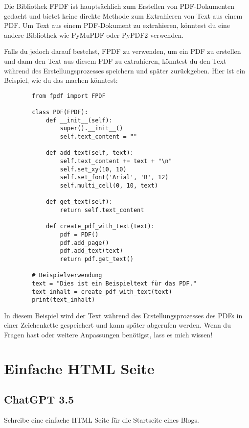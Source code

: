 \begin{tcolorbox}[
	enhanced,
	breakable,
	colback=BhtGrey!5!white,
	colframe=BhtGrey!75!black!50,
	title= Copilot
	]
	Die Bibliothek FPDF ist hauptsächlich zum Erstellen von PDF-Dokumenten gedacht und bietet keine direkte Methode zum Extrahieren von Text aus einem PDF. Um Text aus einem PDF-Dokument zu extrahieren, könntest du eine andere Bibliothek wie PyMuPDF oder PyPDF2 verwenden.
	
	Falls du jedoch darauf bestehst, FPDF zu verwenden, um ein PDF zu erstellen und dann den Text aus diesem PDF zu extrahieren, könntest du den Text während des Erstellungsprozesses speichern und später zurückgeben. Hier ist ein Beispiel, wie du das machen könntest:
	\begin{verbatim}
		from fpdf import FPDF
		
		class PDF(FPDF):
		    def __init__(self):
		        super().__init__()
		        self.text_content = ""
		
		    def add_text(self, text):
		        self.text_content += text + "\n"
		        self.set_xy(10, 10)
		        self.set_font('Arial', 'B', 12)
		        self.multi_cell(0, 10, text)
		
		    def get_text(self):
		        return self.text_content
		
		    def create_pdf_with_text(text):
		        pdf = PDF()
		        pdf.add_page()
		        pdf.add_text(text)
		        return pdf.get_text()
		
		# Beispielverwendung
		text = "Dies ist ein Beispieltext für das PDF."
		text_inhalt = create_pdf_with_text(text)
		print(text_inhalt)
	\end{verbatim}
	In diesem Beispiel wird der Text während des Erstellungsprozesses des PDFs in einer Zeichenkette gespeichert und kann später abgerufen werden. Wenn du Fragen hast oder weitere Anpassungen benötigst, lass es mich wissen!
\end{tcolorbox}

\section{Einfache HTML Seite}
\subsection{ChatGPT 3.5}
\begin{tcolorbox}[
	enhanced,
	colback=BhtColorYellow!5!white,
	colframe=BhtColorYellow!75!black,
	title= HTML Startseite
	]
	Schreibe eine einfache HTML Seite für die Startseite eines Blogs.
\end{tcolorbox}

